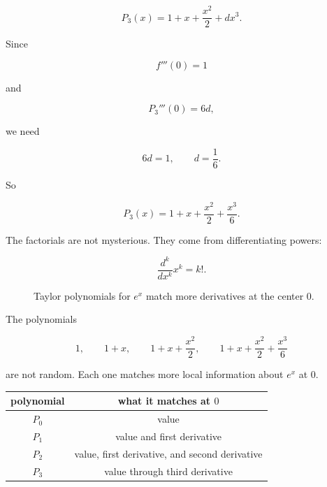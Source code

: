 \[
P_3(x)=1+x+\frac{x^2}{2}+dx^3.
\]

Since

\[
f'''(0)=1
\]

and

\[
P_3'''(0)=6d,
\]

we need

\[
6d=1,
\qquad
d=\frac16.
\]

So

\[
P_3(x)=1+x+\frac{x^2}{2}+\frac{x^3}{6}.
\]

The factorials are not mysterious.  They come from differentiating powers:

\[
\frac{d^k}{dx^k}x^k=k!.
\]

\begin{figure}[h]
\centering
{}
\caption{Taylor polynomials for \(e^x\) match more derivatives at the center \(0\).}
\label{fig:taylor-polynomials-exp}
\end{figure}

The polynomials

\[
1,
\qquad
1+x,
\qquad
1+x+\frac{x^2}{2},
\qquad
1+x+\frac{x^2}{2}+\frac{x^3}{6}
\]

are not random.  Each one matches more local information about \(e^x\) at \(0\).

\begin{center}
\begin{tabular}{c|c}
\textbf{polynomial} & \textbf{what it matches at \(0\)} \\ \hline
\(P_0\) & value \\
\(P_1\) & value and first derivative \\
\(P_2\) & value, first derivative, and second derivative \\
\(P_3\) & value through third derivative
\end{tabular}
\end{center}

